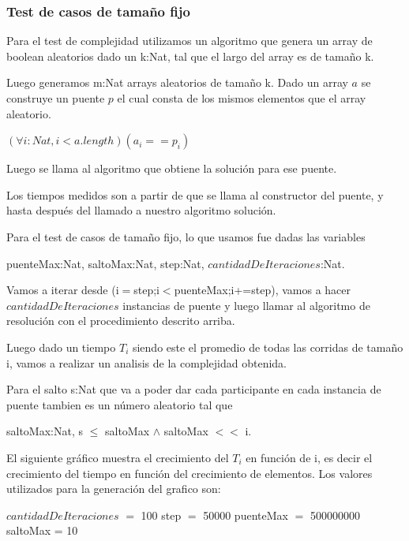 \newpage



\subsubsection{Test de casos de tamaño fijo}


Para el test de complejidad utilizamos un algoritmo que genera un array de boolean aleatorios dado un k:Nat, tal que el largo del array es de tamaño k.

Luego generamos m:Nat arrays aleatorios de tamaño k. Dado un array $a$ se construye un puente $p$ el cual consta de los mismos elementos que el array aleatorio. 

$(\forall i:Nat, i < a.length)(a_{i} == p_{i})$

Luego se llama al algoritmo que obtiene la soluci\'on para ese puente.

Los tiempos medidos son a partir de que se llama al constructor del puente, y hasta despu\'es del llamado a nuestro algoritmo soluci\'on.

Para el test de casos de tamaño fijo, lo que usamos fue dadas las variables 

puenteMax:Nat, saltoMax:Nat, step:Nat, $cantidadDeIteraciones$:Nat. 

Vamos a iterar desde (i$=$step;i$<$puenteMax;i+=step), vamos a hacer $cantidadDeIteraciones$ instancias de puente y luego llamar al algoritmo de resoluci\'on con el procedimiento descrito arriba.

Luego dado un tiempo $T_{i}$ siendo este el promedio de todas las corridas de tamaño i, vamos a realizar un analisis de la complejidad obtenida.

Para el salto s:Nat que va a poder dar cada participante en cada instancia de puente tambien es un n\'umero aleatorio tal que

saltoMax:Nat, s $\leq$ saltoMax $\wedge$ saltoMax $<<$ i.

El siguiente gr\'afico muestra el crecimiento del $T_{i}$ en funci\'on de i, es decir el crecimiento del tiempo en funci\'on del crecimiento de elementos.
Los valores utilizados para la generaci\'on del grafico son:

\newpage

$cantidadDeIteraciones$ $=$ 100 step $=$ 50000 puenteMax $=$ 500000000 saltoMax = 10

